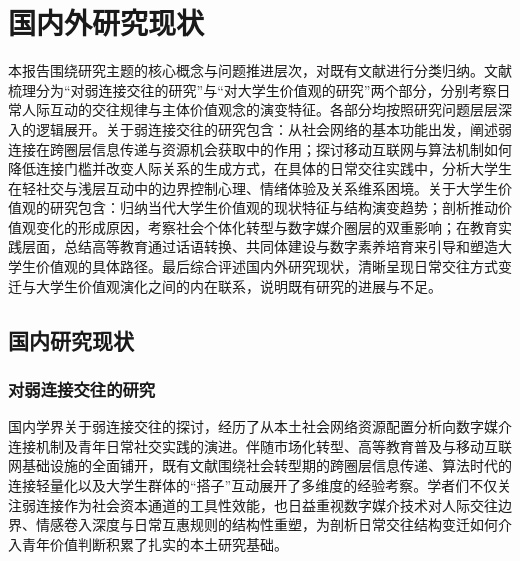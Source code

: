 \section{国内外研究现状}
\label{sec:research-status}

本报告围绕研究主题的核心概念与问题推进层次，对既有文献进行分类归纳。文献梳理分为“对弱连接交往的研究”与“对大学生价值观的研究”两个部分，分别考察日常人际互动的交往规律与主体价值观念的演变特征。各部分均按照研究问题层层深入的逻辑展开。关于弱连接交往的研究包含：从社会网络的基本功能出发，阐述弱连接在跨圈层信息传递与资源机会获取中的作用；探讨移动互联网与算法机制如何降低连接门槛并改变人际关系的生成方式，在具体的日常交往实践中，分析大学生在轻社交与浅层互动中的边界控制心理、情绪体验及关系维系困境。关于大学生价值观的研究包含：归纳当代大学生价值观的现状特征与结构演变趋势；剖析推动价值观变化的形成原因，考察社会个体化转型与数字媒介圈层的双重影响；在教育实践层面，总结高等教育通过话语转换、共同体建设与数字素养培育来引导和塑造大学生价值观的具体路径。最后综合评述国内外研究现状，清晰呈现日常交往方式变迁与大学生价值观演化之间的内在联系，说明既有研究的进展与不足。

\subsection{国内研究现状}
\label{sec:domestic-research}

\subsubsection{对弱连接交往的研究}

国内学界关于弱连接交往的探讨，经历了从本土社会网络资源配置分析向数字媒介连接机制及青年日常社交实践的演进。伴随市场化转型、高等教育普及与移动互联网基础设施的全面铺开，既有文献围绕社会转型期的跨圈层信息传递、算法时代的连接轻量化以及大学生群体的“搭子”互动展开了多维度的经验考察。学者们不仅关注弱连接作为社会资本通道的工具性效能，也日益重视数字媒介技术对人际交往边界、情感卷入深度与日常互惠规则的结构性重塑，为剖析日常交往结构变迁如何介入青年价值判断积累了扎实的本土研究基础。

